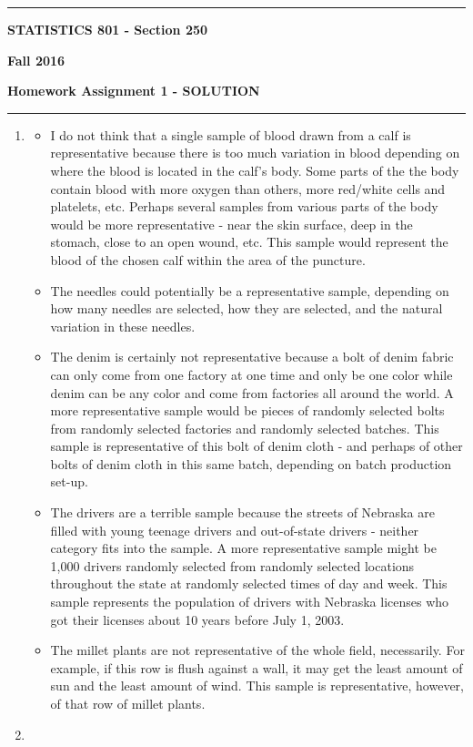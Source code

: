 \documentclass[12pt]{article}
\begin{document}
\hrule
\medskip
\centerline{\textbf{STATISTICS 801 - Section 250}}\hfill \textbf{Fall 2016}
\centerline{\textbf{Homework Assignment 1 - SOLUTION}}
\smallskip
\hrule
\begin{enumerate}
\item 
\begin{itemize}
\item I do not think that a single sample of blood drawn from a calf is representative because there is too much variation in blood depending on where the blood is located in the calf’s body. Some parts of the the body contain blood with more oxygen than others, more red/white cells and platelets, etc. Perhaps several samples from various parts of the body would be more representative - near the skin surface, deep in the stomach, close to an open wound, etc. This sample would represent the blood of the chosen calf within the area of the puncture.
\item The needles could potentially be a representative sample, depending on how many needles are selected, how they are selected, and the natural variation in these needles.
\item The denim is certainly not representative because a bolt of denim fabric can only come from one factory at one time and only be one color while denim can be any color and come from factories all around the world. A more representative sample would be pieces of randomly selected bolts from randomly selected factories and randomly selected batches. This sample is representative of this bolt of denim cloth - and perhaps of other bolts of denim cloth in this same batch, depending on batch production set-up.
\item  The drivers are a terrible sample because the streets of Nebraska are filled with young teenage drivers and out-of-state drivers - neither category fits into the sample. A more representative sample might be 1,000 drivers randomly selected from randomly selected locations throughout the state at randomly selected times of day and week. This sample represents the population of drivers with Nebraska licenses who got their licenses about 10 years before July 1, 2003.
\item The millet plants are not representative of the whole field, necessarily. For example, if this row is flush against a wall, it may get the least amount of sun and the least amount of wind. This sample is representative, however, of that row of millet plants.
\end{itemize}
\item 

\end{enumerate}
\end{document}
